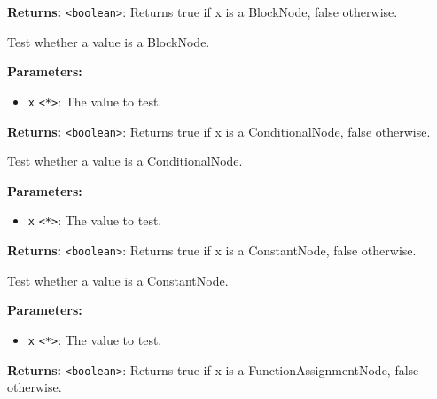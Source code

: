 \documentclass[12pt,a4paper]{article}
\begin{document}
\noindent \textbf{Returns:} \texttt{<boolean>}: Returns true if \textasciigrave{}x\textasciigrave{} is a BlockNode, false otherwise.

\noindent Test whether a value is a BlockNode.

\vspace{5mm}
\noindent {}


\noindent \textbf{Parameters:}
\begin{itemize}
  \item \texttt{x} \texttt{<*>}: The value to test.
\end{itemize}

\noindent \textbf{Returns:} \texttt{<boolean>}: Returns true if \textasciigrave{}x\textasciigrave{} is a ConditionalNode, false otherwise.

\noindent Test whether a value is a ConditionalNode.

\vspace{5mm}
\noindent {}


\noindent \textbf{Parameters:}
\begin{itemize}
  \item \texttt{x} \texttt{<*>}: The value to test.
\end{itemize}

\noindent \textbf{Returns:} \texttt{<boolean>}: Returns true if \textasciigrave{}x\textasciigrave{} is a ConstantNode, false otherwise.

\noindent Test whether a value is a ConstantNode.

\vspace{5mm}
\noindent {}


\noindent \textbf{Parameters:}
\begin{itemize}
  \item \texttt{x} \texttt{<*>}: The value to test.
\end{itemize}

\noindent \textbf{Returns:} \texttt{<boolean>}: Returns true if \textasciigrave{}x\textasciigrave{} is a FunctionAssignmentNode, false otherwise.
\end{document}
